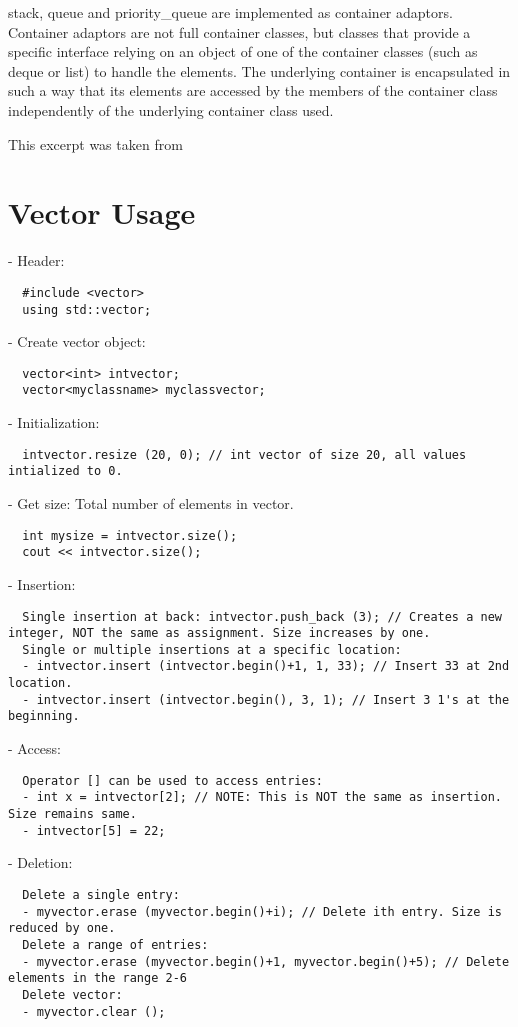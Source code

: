 \documentclass[12pt,a4paper]{article}
\begin{document}
stack, queue and priority\_queue are implemented as container adaptors.
Container adaptors are not full container classes, but classes that provide a specific interface relying
on an object of one of the container classes (such as deque or list) to handle the elements.
The underlying container is encapsulated in such a way that its elements are accessed by the members of the
container class independently of the underlying container class used.

This excerpt was taken from \cite{Ref:CPP-STL}
\section{Vector Usage}
- Header:
\begin{verbatim}
  #include <vector>
  using std::vector;
\end{verbatim}
- Create vector object:
\begin{verbatim}
  vector<int> intvector;
  vector<myclassname> myclassvector;
\end{verbatim}
- Initialization:
\begin{verbatim}
  intvector.resize (20, 0); // int vector of size 20, all values intialized to 0.
\end{verbatim}
- Get size: Total number of elements in vector.
\begin{verbatim}
  int mysize = intvector.size();
  cout << intvector.size(); 
\end{verbatim}
- Insertion:
\begin{lstlisting}
  Single insertion at back: intvector.push_back (3); // Creates a new integer, NOT the same as assignment. Size increases by one.
  Single or multiple insertions at a specific location:
  - intvector.insert (intvector.begin()+1, 1, 33); // Insert 33 at 2nd location.
  - intvector.insert (intvector.begin(), 3, 1); // Insert 3 1's at the beginning.
\end{lstlisting}
- Access:
\begin{lstlisting}
  Operator [] can be used to access entries:
  - int x = intvector[2]; // NOTE: This is NOT the same as insertion. Size remains same.
  - intvector[5] = 22;
\end{lstlisting}
- Deletion:
\begin{lstlisting}
  Delete a single entry: 
  - myvector.erase (myvector.begin()+i); // Delete ith entry. Size is reduced by one.
  Delete a range of entries: 
  - myvector.erase (myvector.begin()+1, myvector.begin()+5); // Delete elements in the range 2-6
  Delete vector:
  - myvector.clear ();
\end{lstlisting}
\end{document}
